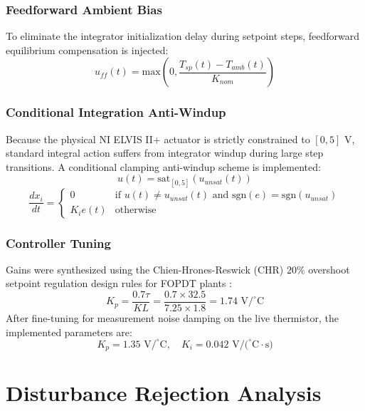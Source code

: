 \documentclass[conference]{IEEEtran}
\begin{document}
\subsubsection{Feedforward Ambient Bias}
To eliminate the integrator initialization delay during setpoint steps, feedforward equilibrium compensation is injected:
\begin{equation}
u_{ff}(t) = \text{max}\left(0, \frac{T_{sp}(t) - T_{amb}(t)}{K_{nom}}\right)
\end{equation}

\subsubsection{Conditional Integration Anti-Windup}
Because the physical NI ELVIS II+ actuator is strictly constrained to $[0, 5]\text{ V}$, standard integral action suffers from integrator windup during large step transitions. A conditional clamping anti-windup scheme is implemented:
\begin{equation}
u(t) = \text{sat}_{[0, 5]} \left( u_{unsat}(t) \right)
\end{equation}
\begin{equation}
\frac{d x_i}{dt} = \begin{cases} 
0 & \text{if } u(t) \neq u_{unsat}(t) \text{ and } \text{sgn}(e) = \text{sgn}(u_{unsat}) \\
K_i e(t) & \text{otherwise}
\end{cases}
\end{equation}

\subsubsection{Controller Tuning}
Gains were synthesized using the Chien-Hrones-Reswick (CHR) $20\%$ overshoot setpoint regulation design rules for FOPDT plants \cite{astrom2006}:
\begin{equation}
K_p = \frac{0.7 \tau}{K L} = \frac{0.7 \times 32.5}{7.25 \times 1.8} = 1.74\text{ V/}^\circ\text{C}
\end{equation}
After fine-tuning for measurement noise damping on the live thermistor, the implemented parameters are:
\begin{equation}
K_p = 1.35\text{ V/}^\circ\text{C}, \quad K_i = 0.042\text{ V/(}^\circ\text{C}\cdot\text{s)}
\end{equation}

\section{Disturbance Rejection Analysis}
\end{document}
